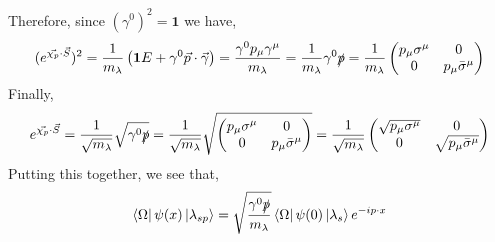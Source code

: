 \documentclass[12pt]{article}
\begin{document}
Therefore, since $(\gamma^0)^2 = \mathbf{1}$ we have,
\begin{align*}
(e^{\vec{\chi_p} \cdot \vec{S}})^2 = \frac{1}{m_\lambda} \left( \mathbf{1} E + \gamma^0 \vec{p} \cdot \vec{\gamma} \right) = \frac{\gamma^0 p_\mu \gamma^\mu}{m_\lambda} = \frac{1}{m_\lambda} \gamma^0 \slashed{p} = \frac{1}{m_\lambda}
\begin{pmatrix}
p_\mu \sigma^\mu & 0 \\
0 & p_\mu \bar{\sigma}^\mu 
\end{pmatrix}
\end{align*}
Finally,
\begin{align*}
e^{\vec{\chi_p} \cdot \vec{S}} = \frac{1}{\sqrt{m_\lambda}} \sqrt{\gamma^0 \slashed{p}} = \frac{1}{\sqrt{m_\lambda}} \sqrt{
\begin{pmatrix}
p_\mu \sigma^\mu & 0 \\
0 & p_\mu \bar{\sigma}^\mu 
\end{pmatrix}}
= \frac{1}{\sqrt{m_\lambda}} 
\begin{pmatrix}
\sqrt{p_\mu \sigma^\mu} & 0 \\
0 & \sqrt{p_\mu \bar{\sigma}^\mu}
\end{pmatrix}
\end{align*}
Putting this together, we see that,
\[ \left< \Omega \right| \psi(x) \left| \lambda_{s p} \right> = \sqrt{\frac{\gamma^0 \slashed{p}}{m_\lambda}} \left< \Omega \right| \psi(0) \left| \lambda_{s} \right> e^{ -i p \cdot x} \] 
\end{document}
